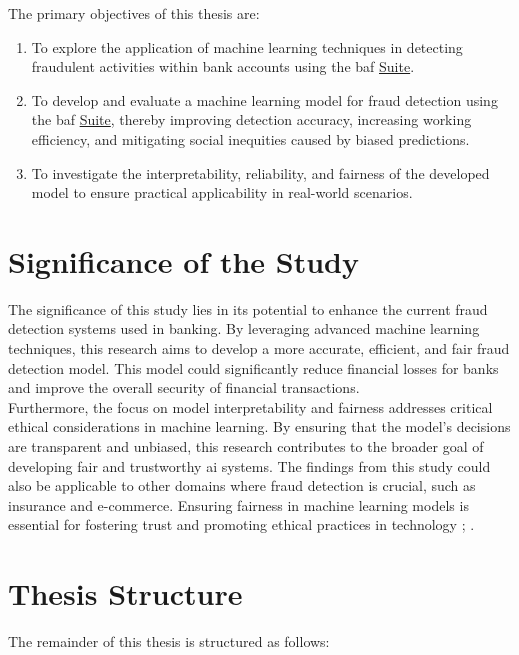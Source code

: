 \documentclass[12pt,a4paper]{report}
\begin{document}
The primary objectives of this thesis are:
\begin{enumerate}
    \item To explore the application of machine learning techniques in detecting fraudulent activities within bank accounts using the \acrshort{baf} \href{https://www.kaggle.com/datasets/sgpjesus/bank-account-fraud-dataset-neurips-2022/code}{Suite}.\\
    \item To develop and evaluate a machine learning model for fraud detection using the \acrshort{baf} \href{https://www.kaggle.com/datasets/sgpjesus/bank-account-fraud-dataset-neurips-2022/code}{Suite}, thereby improving detection accuracy, increasing working efficiency, and mitigating social inequities caused by biased predictions.
    \item To investigate the interpretability, reliability, and fairness of the developed model to ensure practical applicability in real-world scenarios.
\end{enumerate}


\section{Significance of the Study}
The significance of this study lies in its potential to enhance the current fraud detection systems used in banking. By leveraging advanced machine learning techniques, this research aims to develop a more accurate, efficient, and fair fraud detection model. This model could significantly reduce financial losses for banks and improve the overall security of financial transactions.\\

Furthermore, the focus on model interpretability and fairness addresses critical ethical considerations in machine learning. By ensuring that the model’s decisions are transparent and unbiased, this research contributes to the broader goal of developing fair and trustworthy \acrshort{ai} systems. The findings from this study could also be applicable to other domains where fraud detection is crucial, such as insurance and e-commerce. Ensuring fairness in machine learning models is essential for fostering trust and promoting ethical practices in technology \citep{barocas2023fairness}; \citep{mehrabi2021survey}.\\

\clearpage

\section{Thesis Structure}
The remainder of this thesis is structured as follows:
\end{document}
